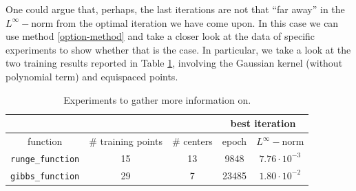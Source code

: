 \documentclass[12pt]{report} %
\begin{document}

One could argue that, perhaps, the last iterations are not that ``far away'' in the $L^\infty-$norm from the optimal iteration we have come upon. In this case we can use method \ref{option-method} and take a closer look at the data of specific experiments to show whether that is the case. In particular, we take a look at the two training results reported in Table
\ref{table-compare-instances}, involving the Gaussian kernel (without
polynomial term) and equispaced points.


\begin{table}[h]
  \begin{tabular}{ccc|cc|}
    \cline{4-5}
                                                   &                                         &            & \multicolumn{2}{c|}{best iteration}                         \\ \hline
    \multicolumn{1}{|c|}{function}                 & \multicolumn{1}{c|}{\# training points} & \# centers & \multicolumn{1}{c|}{epoch}          & $L^{\infty} -$norm    \\ \hline
    \multicolumn{1}{|c|}{\texttt{runge\_function}} & \multicolumn{1}{c|}{15}                 & 13         & \multicolumn{1}{c|}{9848}           & $7.76 \cdot 10^{- 3}$ \\ \hline
    \multicolumn{1}{|c|}{\texttt{gibbs\_function}} & \multicolumn{1}{c|}{29}                 & 7          & \multicolumn{1}{c|}{23485}          & $1.80 \cdot 10^{- 2}$ \\ \hline
  \end{tabular}
  \caption{Experiments to gather more information
    on.}\label{table-compare-instances}
\end{table}
\end{document}
